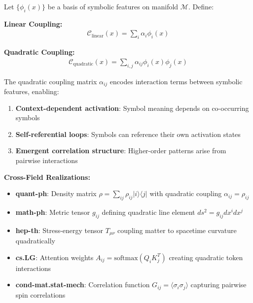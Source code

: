 \begin{definition}
\label{definition:symbolic_coupling}
Let $\{\phi_i(x)\}$ be a basis of symbolic features on manifold $\mathcal{M}$. Define:

\textbf{Linear Coupling:}
\begin{align}
\mathcal{C}_{\text{linear}}(x) = \sum_i \alpha_i \phi_i(x)
\end{align}

\textbf{Quadratic Coupling:}
\begin{align}
\mathcal{C}_{\text{quadratic}}(x) = \sum_{i,j} \alpha_{ij} \phi_i(x) \phi_j(x)
\end{align}

The quadratic coupling matrix $\alpha_{ij}$ encodes interaction terms between symbolic features, enabling:
\begin{enumerate}
\item \textbf{Context-dependent activation}: Symbol meaning depends on co-occurring symbols
\item \textbf{Self-referential loops}: Symbols can reference their own activation states  
\item \textbf{Emergent correlation structure}: Higher-order patterns arise from pairwise interactions
\end{enumerate}

\textbf{Cross-Field Realizations:}
\begin{itemize}
\item \textbf{quant-ph}: Density matrix $\rho = \sum_{ij} \rho_{ij} |i\rangle \langle j|$ with quadratic coupling $\alpha_{ij} = \rho_{ij}$
\item \textbf{math-ph}: Metric tensor $g_{ij}$ defining quadratic line element $ds^2 = g_{ij} dx^i dx^j$
\item \textbf{hep-th}: Stress-energy tensor $T_{\mu\nu}$ coupling matter to spacetime curvature quadratically
\item \textbf{cs.LG}: Attention weights $A_{ij} = \text{softmax}(Q_i K_j^T)$ creating quadratic token interactions
\item \textbf{cond-mat.stat-mech}: Correlation function $G_{ij} = \langle \sigma_i \sigma_j \rangle$ capturing pairwise spin correlations
\end{itemize}
\end{definition}

